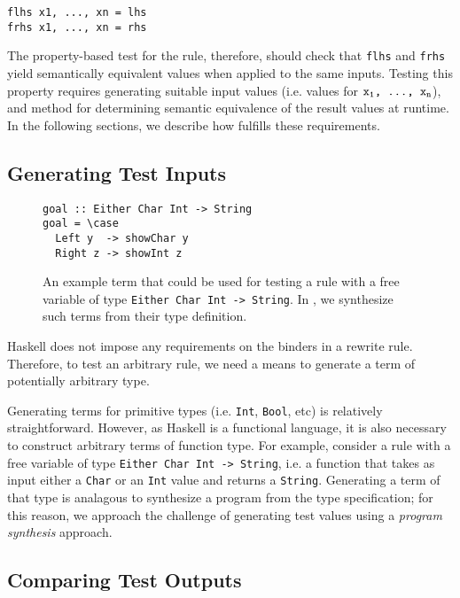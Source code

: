 \begin{verbatim}
flhs x1, ..., xn = lhs
frhs x1, ..., xn = rhs
\end{verbatim}

The property-based test for the rule, therefore, should check that \texttt{flhs}
and \texttt{frhs} yield semantically equivalent values when applied to the same
inputs. Testing this property requires generating suitable input values (i.e.
values for $\texttt{x\textsubscript{1}, \ldots, x\textsubscript{n}}$), and method for determining semantic equivalence of the
result values at runtime. In the following sections, we describe how \Rulecheck
fulfills these requirements.

\subsection{Generating Test Inputs}\label{sec:methodology:testinput}

\begin{figure}
  \begin{verbatim}
goal :: Either Char Int -> String
goal = \case
  Left y  -> showChar y
  Right z -> showInt z
  \end{verbatim}
  \caption{An example term that could be used for testing a rule with a free
variable of type \texttt{Either Char Int -> String}. In \Rulecheck, we
synthesize such terms from their type definition.}
  \label{fig:synthexample}
\end{figure}

Haskell does not impose any requirements on the binders \rbinders in a rewrite
rule. Therefore, to test an arbitrary rule, we need a means to generate a term
of potentially arbitrary type.

Generating terms for primitive types (i.e. \texttt{Int}, \texttt{Bool}, etc) is
relatively straightforward. However, as Haskell is a functional language, it is
also necessary to construct arbitrary terms of function type. For example,
consider a rule with a free variable of type \texttt{Either Char Int -> String},
i.e. a function that takes as input either a \texttt{Char} or an \texttt{Int}
value and returns a \texttt{String}. Generating a term of
that type is analagous to synthesize a program from the type specification; for
this reason, we approach the challenge of generating test values using a
\textit{program synthesis} approach.


\subsection{Comparing Test Outputs}\label{sec:methodology:testoutput}

